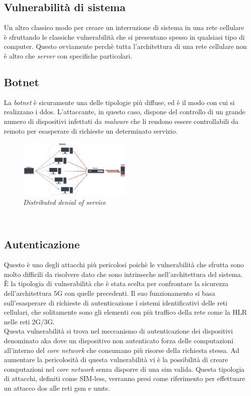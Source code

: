 \subsection{Vulnerabilità di sistema}
Un altro classico modo per creare un interruzione di sistema in una rete cellulare è sfruttando le classiche vulnerabilità che si presentano spesso in qualsiasi tipo di computer.
Questo ovviamente perchè tutta l'architettura di una rete cellulare non è altro che \textit{server} con specifiche particolari.

\subsection{Botnet}
La \textit{botnet} è sicuramente una delle tipologie più diffuse, ed è il modo con cui si realizzano i \gls{ddos}. L'attaccante, in questo caso, dispone del controllo di 
un grande numero di dispositivi infettati da \textit{malware} che li rendono essere controllabili da remoto per esasperare di richieste un determinato servizio.
\begin{figure}[h]
    \centering
    \includegraphics[width=0.5\textwidth]{images/ddos.jpg}
    \caption{\textit{Distributed denial of service}}
\end{figure}\\

\subsection{Autenticazione}
Questo è uno degli attacchi più pericolosi poichè le vulnerabilità che sfrutta sono molto difficili da risolvere dato che sono intrinseche nell'architettura del sistema.
È la tipologia di vulnerabilità che è stata scelta per confrontare la sicurezza dell'architettura 5G con quelle precedenti.
Il suo funzionamento si basa sull'esasperare di richieste di autenticazione i sistemi identificativi delle reti cellulari, che solitamente 
sono gli elementi con più traffico della rete come la HLR nelle reti 2G/3G.\\
Questa vulnerabilità si trova nel meccanismo di autenticazione dei dispositivi denominato \gls{aka} dove un dispositivo
non autenticato forza delle computazioni all'interno del \textit{core network} che consumano più risorse della richiesta stessa\cite{umts-dos}.
Ad aumentare la pericolosità di questa vulnerabilità vi è la possibilità di creare computazioni nel \textit{core network} 
senza disporre di una \gls{sim} valida. Questa tipologia di attacchi, definiti come SIM-less, verranno presi come riferimento per effettuare un attacco \gls{dos} alle 
reti \gls{gsm}\cite{gsm-dos-simless} e \gls{umts}\cite{umts-dos}.



